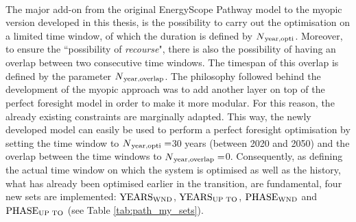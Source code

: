 \\

\noindent
The major add-on from the original EnergyScope Pathway model \cite{limpens2021generating} to the myopic version developed in this thesis, is the possibility to carry out the optimisation on a limited time window, of which the duration is defined by $N\textsubscript{year,opti}$. Moreover, to ensure the ``possibility of \textit{recourse}", there is also the possibility of having an overlap between two consecutive time windows. The timespan of this overlap is defined by the parameter $N\textsubscript{year,overlap}$. The philosophy followed behind the development of the myopic approach was to add another layer on top of the perfect foresight model in order to make it more modular. For this reason, the already existing constraints are marginally adapted. This way, the newly developed model can easily be used to perform a perfect foresight optimisation by setting the time window to $N\textsubscript{year,opti}=$30 years (\ie between 2020 and 2050) and the overlap between the time windows to $N\textsubscript{year,overlap}=$0.  Consequently, as defining the actual time window on which the system is optimised as well as the history, \ie what has already been optimised earlier in the transition, are fundamental, four new sets are implemented: $\text{YEARS}\textsubscript{WND}$, $\text{YEARS}\textsubscript{UP TO}$, $\text{PHASE}\textsubscript{WND}$ and $\text{PHASE}\textsubscript{UP TO}$ (see Table \ref{tab:path_my_sets}).

\begin{table}[htbp]
\caption[New SETs for myopic pathway formulation.]{New SETs for myopic pathway formulation.} 
\label{tab:path_my_sets}
\begin{minipage}{\textwidth}
\centering
{}
\end{minipage}
\end{table}

